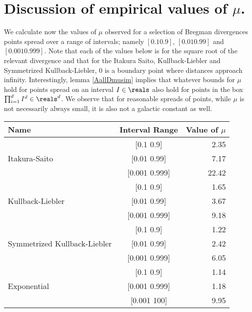 \documentclass[11pt]{myclass}
\begin{document}
\section{Discussion of empirical values of $\mu$.}
\label{sec:muranges}
We calculate now the values of $\mu$ observed for a selection of Bregman divergences points spread over a range of intervals; namely $[0.1 0.9]$, $[0.01 0.99]$ and
$[0.001 0.999]$.   Note that each of the values below is for the square root of the relevant divergence and that for the
Itakura Saito, Kullback-Liebler and Symmetrized Kullback-Liebler, $0$ is a boundary point where distances approach infinity. 
Interestingly, lemma \ref{AallDmusim} implies that whatever bounds for $\mu$ hold for points spread on an interval $I \in \reals$ also hold for points in the box $\prod_{i=1}^{d} I^d \in \reals^d$. We observe that for reasonable spreads of points,
while $\mu$ is not necessarily always small, it is also not a galactic constant as well.

\begin{center}
  \begin{tabular}{| l | c | r |}
    \hline
    Name & Interval Range & Value of $\mu$ \\ \hline
     & [0.1 0.9] & 2.35 \\ 
     Itakura-Saito & [0.01 0.99] & 7.17 \\ 
     & [0.001 0.999] & 22.42 \\   
     \hline
     & [0.1 0.9] & 1.65 \\ 
     Kullback-Liebler & [0.01 0.99] & 3.67 \\ 
     & [0.001 0.999] & 9.18 \\   
     \hline
     & [0.1 0.9] & 1.22 \\ 
     Symmetrized Kullback-Liebler & [0.01 0.99] & 2.42 \\ 
     & [0.001 0.999] & 6.05 \\   
     \hline
     & [0.1 0.9] & 1.14 \\ 
     Exponential  & [0.001 0.999] & 1.18 \\ 
     & [0.001 100] & 9.95 \\   
     \hline
  \end{tabular}
\end{center}
\newpage


\end{document}
